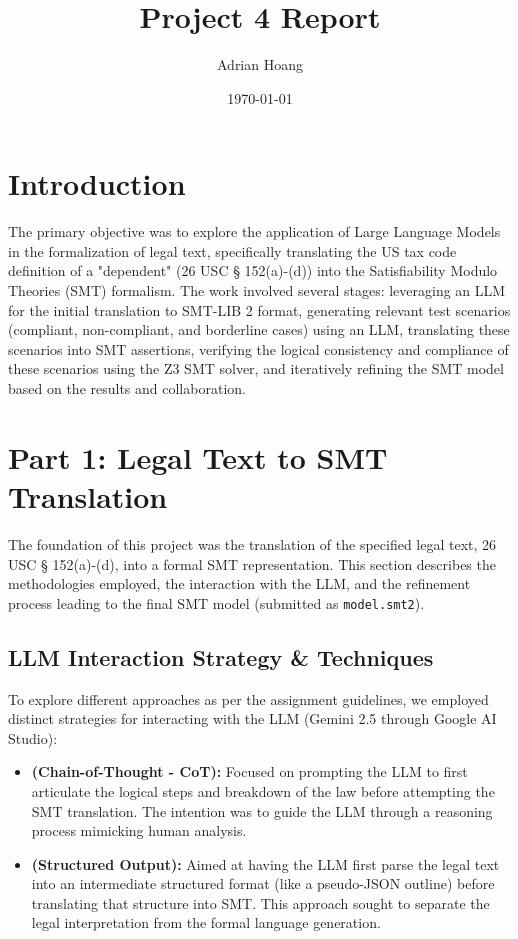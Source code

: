 \documentclass[11pt, letterpaper]{article}
\title{Project 4 Report}
\author{Adrian Hoang}
\date{\today}
\begin{document}
\maketitle

\section{Introduction}

The primary objective was to explore the application of Large Language Models in the formalization of legal text, specifically translating the US tax code definition of a "dependent" (26 USC § 152(a)-(d)) into the Satisfiability Modulo Theories (SMT) formalism. The work involved several stages: leveraging an LLM for the initial translation to SMT-LIB 2 format, generating relevant test scenarios (compliant, non-compliant, and borderline cases) using an LLM, translating these scenarios into SMT assertions, verifying the logical consistency and compliance of these scenarios using the Z3 SMT solver, and iteratively refining the SMT model based on the results and collaboration.

\section{Part 1: Legal Text to SMT Translation}

The foundation of this project was the translation of the specified legal text, 26 USC § 152(a)-(d), into a formal SMT representation. This section describes the methodologies employed, the interaction with the LLM, and the refinement process leading to the final SMT model (submitted as \texttt{model.smt2}).

\subsection{LLM Interaction Strategy \& Techniques}

To explore different approaches as per the assignment guidelines, we employed distinct strategies for interacting with the LLM (Gemini 2.5 through Google AI Studio):

\begin{itemize}
    \item \textbf{(Chain-of-Thought - CoT):} Focused on prompting the LLM to first articulate the logical steps and breakdown of the law before attempting the SMT translation. The intention was to guide the LLM through a reasoning process mimicking human analysis.
    \item \textbf{(Structured Output):} Aimed at having the LLM first parse the legal text into an intermediate structured format (like a pseudo-JSON outline) before translating that structure into SMT. This approach sought to separate the legal interpretation from the formal language generation.
\end{itemize}
\end{document}
